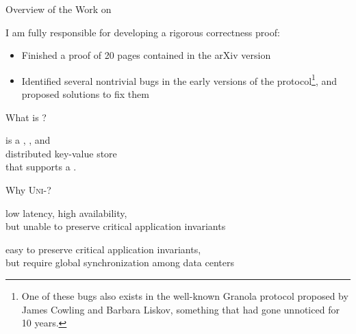 \begin{frame}{Overview of the Work on \unistore}
  \begin{center}
    \vspace{0.20cm}

    \vspace{0.80cm}
    \noindent I am fully responsible for developing a rigorous correctness proof: \\[3pt]

    \begin{itemize}
      \item Finished a proof of 20 pages contained in the \textsf{arXiv} version
      \item Identified several nontrivial bugs in the early versions of the
            protocol\footnote{ One of these bugs also exists in the well-known Granola
              protocol proposed by James Cowling and Barbara Liskov, something that had gone
              unnoticed for 10 years.}, and proposed solutions to fix them
    \end{itemize}
  \end{center}
\end{frame}

\begin{frame}{What is \unistore?}
  \begin{center}
    \unistore{} is a , , and  \\[8pt]
     distributed key-value store \\[8pt]
    that supports a .
  \end{center}
\end{frame}

\begin{frame}{Why \textsc{Uni-}?}
  \begin{center}
     low latency, high availability, \\[3pt]
    but unable to preserve critical application invariants


     easy to preserve critical application invariants, \\[3pt]
    but require global synchronization among data centers
  \end{center}
\end{frame}

